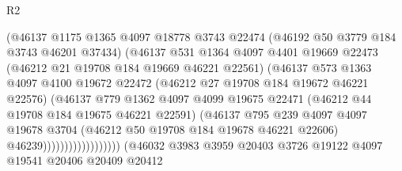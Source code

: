 \begin{lexlean}{R2}
\begin{coremodule}
                                        (@46137
                                          @1175
                                          @1365
                                          @4097
                                          @18778
                                          @3743
                                          @22474
                                          (@46192 @50 @3779 @184 @3743 @46201 @37434)
                                          (@46137
                                            @531
                                            @1364
                                            @4097
                                            @4401
                                            @19669
                                            @22473
                                            (@46212 @21 @19708 @184 @19669 @46221 @22561)
                                            (@46137
                                              @573
                                              @1363
                                              @4097
                                              @4100
                                              @19672
                                              @22472
                                              (@46212 @27 @19708 @184 @19672 @46221 @22576)
                                              (@46137
                                                @779
                                                @1362
                                                @4097
                                                @4099
                                                @19675
                                                @22471
                                                (@46212 @44 @19708 @184 @19675 @46221 @22591)
                                                (@46137
                                                  @795
                                                  @239
                                                  @4097
                                                  @4097
                                                  @19678
                                                  @3704
                                                  (@46212 @50 @19708 @184 @19678 @46221 @22606)
                                                  @46239))))))))))))))))))
              (@46032
                @3983
                @3959
                @20403
                @3726
                @19122
                @4097
                @19541
                @20406
                @20409
                @20412

\end{coremodule}
\end{lexlean}
